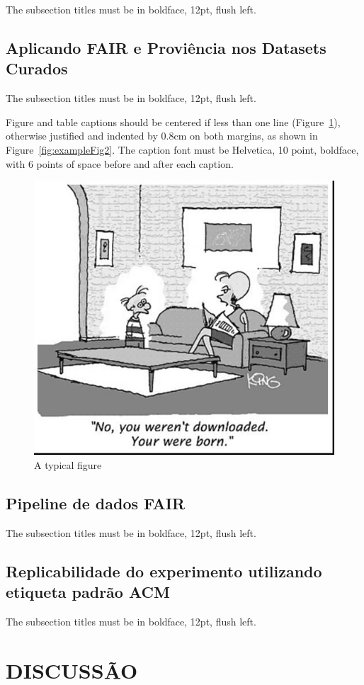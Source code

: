 \documentclass[12pt]{article}
\begin{document}
The subsection titles must be in boldface, 12pt, flush left.

\subsection{Aplicando FAIR e Proviência nos Datasets Curados}

The subsection titles must be in boldface, 12pt, flush left.

Figure and table captions should be centered if less than one line
(Figure~\ref{fig:exampleFig1}), otherwise justified and indented by 0.8cm on
both margins, as shown in Figure~\ref{fig:exampleFig2}. The caption font must
be Helvetica, 10 point, boldface, with 6 points of space before and after each
caption.

\begin{figure}[ht]
\centering
\includegraphics[width=.5\textwidth]{fig1.jpg}
\caption{A typical figure}
\label{fig:exampleFig1}
\end{figure}

\subsection{Pipeline de dados FAIR}

The subsection titles must be in boldface, 12pt, flush left.

\subsection{Replicabilidade do experimento utilizando etiqueta padrão ACM}

The subsection titles must be in boldface, 12pt, flush left.


\section{DISCUSSÃO}
\end{document}
